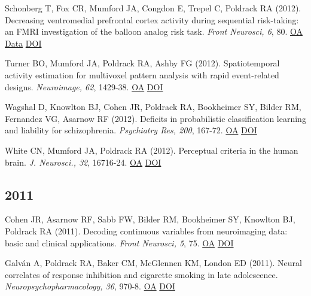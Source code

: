 Schonberg T, Fox CR, Mumford JA, Congdon E, Trepel C, Poldrack RA (2012). Decreasing ventromedial prefrontal cortex activity during sequential risk-taking: an FMRI investigation of the balloon analog risk task. \textit{Front Neurosci, 6}, 80. \href{https://www.ncbi.nlm.nih.gov/pmc/articles/PMC3366349}{OA} \href{https://openneuro.org/datasets/ds000001/versions/1.0.0}{Data} \href{http://dx.doi.org/10.3389/fnins.2012.00080}{DOI} \vspace{2mm}

Turner BO, Mumford JA, Poldrack RA, Ashby FG (2012). Spatiotemporal activity estimation for multivoxel pattern analysis with rapid event-related designs. \textit{Neuroimage, 62}, 1429-38. \href{https://www.ncbi.nlm.nih.gov/pmc/articles/PMC3408801}{OA} \href{http://dx.doi.org/10.1016/j.neuroimage.2012.05.057}{DOI} \vspace{2mm}

Wagshal D, Knowlton BJ, Cohen JR, Poldrack RA, Bookheimer SY, Bilder RM, Fernandez VG, Asarnow RF (2012). Deficits in probabilistic classification learning and liability for schizophrenia. \textit{Psychiatry Res, 200}, 167-72. \href{https://www.ncbi.nlm.nih.gov/pmc/articles/PMC5332149}{OA} \href{http://dx.doi.org/10.1016/j.psychres.2012.06.009}{DOI} \vspace{2mm}

White CN, Mumford JA, Poldrack RA (2012). Perceptual criteria in the human brain. \textit{J. Neurosci., 32}, 16716-24. \href{https://www.ncbi.nlm.nih.gov/pmc/articles/PMC6621768}{OA} \href{http://dx.doi.org/10.1523/jneurosci.1744-12.2012}{DOI} \vspace{2mm}

\subsection*{2011}

Cohen JR, Asarnow RF, Sabb FW, Bilder RM, Bookheimer SY, Knowlton BJ, Poldrack RA (2011). Decoding continuous variables from neuroimaging data: basic and clinical applications. \textit{Front Neurosci, 5}, 75. \href{https://www.ncbi.nlm.nih.gov/pmc/articles/PMC3118657}{OA} \href{http://dx.doi.org/10.3389/fnins.2011.00075}{DOI} \vspace{2mm}

Galván A, Poldrack RA, Baker CM, McGlennen KM, London ED (2011). Neural correlates of response inhibition and cigarette smoking in late adolescence. \textit{Neuropsychopharmacology, 36}, 970-8. \href{https://www.ncbi.nlm.nih.gov/pmc/articles/PMC3077266}{OA} \href{http://dx.doi.org/10.1038/npp.2010.235}{DOI} \vspace{2mm}

